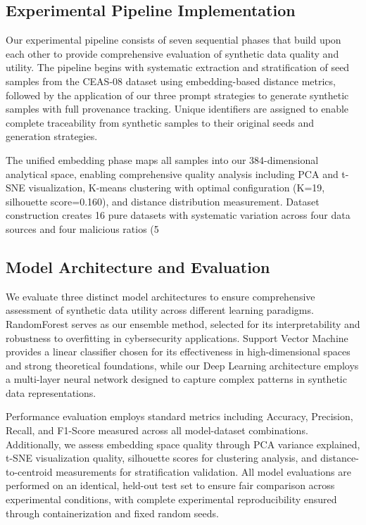 \subsection{Experimental Pipeline Implementation}

Our experimental pipeline consists of seven sequential phases that build upon each other to provide comprehensive evaluation of synthetic data quality and utility. The pipeline begins with systematic extraction and stratification of seed samples from the CEAS-08 dataset using embedding-based distance metrics, followed by the application of our three prompt strategies to generate synthetic samples with full provenance tracking. Unique identifiers are assigned to enable complete traceability from synthetic samples to their original seeds and generation strategies.

The unified embedding phase maps all samples into our 384-dimensional analytical space, enabling comprehensive quality analysis including PCA and t-SNE visualization, K-means clustering with optimal configuration (K=19, silhouette score=0.160), and distance distribution measurement. Dataset construction creates 16 pure datasets with systematic variation across four data sources and four malicious ratios (5%

\subsection{Model Architecture and Evaluation}

We evaluate three distinct model architectures to ensure comprehensive assessment of synthetic data utility across different learning paradigms. RandomForest serves as our ensemble method, selected for its interpretability and robustness to overfitting in cybersecurity applications. Support Vector Machine provides a linear classifier chosen for its effectiveness in high-dimensional spaces and strong theoretical foundations, while our Deep Learning architecture employs a multi-layer neural network designed to capture complex patterns in synthetic data representations.

Performance evaluation employs standard metrics including Accuracy, Precision, Recall, and F1-Score measured across all model-dataset combinations. Additionally, we assess embedding space quality through PCA variance explained, t-SNE visualization quality, silhouette scores for clustering analysis, and distance-to-centroid measurements for stratification validation. All model evaluations are performed on an identical, held-out test set to ensure fair comparison across experimental conditions, with complete experimental reproducibility ensured through containerization and fixed random seeds.